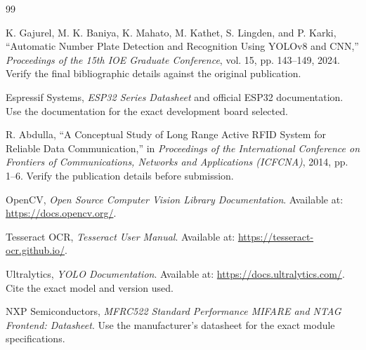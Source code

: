\documentclass[12pt,a4paper]{report}
\begin{document}
\clearpage
\begin{thebibliography}{99}

K. Gajurel, M. K. Baniya, K. Mahato, M. Kathet, S. Lingden, and P. Karki,
``Automatic Number Plate Detection and Recognition Using YOLOv8 and CNN,''
\textit{Proceedings of the 15th IOE Graduate Conference}, vol. 15, pp. 143--149, 2024.
Verify the final bibliographic details against the original publication.

Espressif Systems, \textit{ESP32 Series Datasheet} and official ESP32 documentation.
Use the documentation for the exact development board selected.

R. Abdulla, ``A Conceptual Study of Long Range Active RFID System for Reliable
Data Communication,'' in \textit{Proceedings of the International Conference on
Frontiers of Communications, Networks and Applications (ICFCNA)}, 2014, pp. 1--6.
Verify the publication details before submission.

OpenCV, \textit{Open Source Computer Vision Library Documentation}.
Available at: \url{https://docs.opencv.org/}.

Tesseract OCR, \textit{Tesseract User Manual}.
Available at: \url{https://tesseract-ocr.github.io/}.

Ultralytics, \textit{YOLO Documentation}.
Available at: \url{https://docs.ultralytics.com/}. Cite the exact model and version used.

NXP Semiconductors, \textit{MFRC522 Standard Performance MIFARE and NTAG Frontend:
Datasheet}. Use the manufacturer's datasheet for the exact module specifications.

\end{thebibliography}
\end{document}
